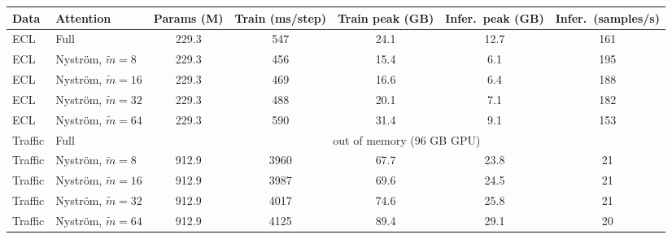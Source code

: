 \begin{tabular}{llccccc}
\toprule
Data & Attention & Params (M) & Train (ms/step) & Train peak (GB) & Infer.\ peak (GB) & Infer.\ (samples/s) \\
\midrule
ECL & Full & 229.3 & 547 & 24.1 & 12.7 & 161 \\
ECL & Nystr\"om, $\tilde m{=}8$ & 229.3 & 456 & 15.4 & 6.1 & 195 \\
ECL & Nystr\"om, $\tilde m{=}16$ & 229.3 & 469 & 16.6 & 6.4 & 188 \\
ECL & Nystr\"om, $\tilde m{=}32$ & 229.3 & 488 & 20.1 & 7.1 & 182 \\
ECL & Nystr\"om, $\tilde m{=}64$ & 229.3 & 590 & 31.4 & 9.1 & 153 \\
\midrule
Traffic & Full & \multicolumn{5}{c}{out of memory (96 GB GPU)} \\
Traffic & Nystr\"om, $\tilde m{=}8$ & 912.9 & 3960 & 67.7 & 23.8 & 21 \\
Traffic & Nystr\"om, $\tilde m{=}16$ & 912.9 & 3987 & 69.6 & 24.5 & 21 \\
Traffic & Nystr\"om, $\tilde m{=}32$ & 912.9 & 4017 & 74.6 & 25.8 & 21 \\
Traffic & Nystr\"om, $\tilde m{=}64$ & 912.9 & 4125 & 89.4 & 29.1 & 20 \\
\bottomrule
\end{tabular}
